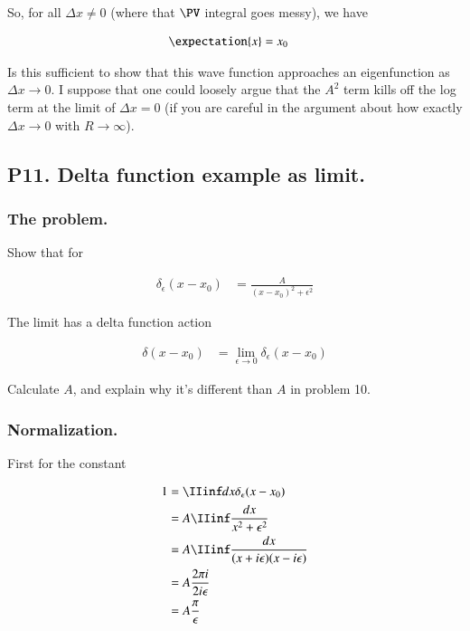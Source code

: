 So, for all $\Delta x \ne 0$ (where that $\PV$ integral goes messy), we have

\begin{align*}
\expectation{x} &= x_0 
\end{align*}

Is this sufficient to show that this wave function approaches an eigenfunction as $\Delta x \rightarrow 0$.
I suppose that one could loosely argue that the $A^2$ term kills off the log term at the limit of $\Delta x = 0$ (if you are careful in the argument about how exactly $\Delta x \rightarrow 0$ with $R \rightarrow \infty$).

\subsection{P11. Delta function example as limit. }

\subsubsection{The problem. }

Show that for

\begin{align*}
\delta_\epsilon(x - x_0) &= \frac{A}{(x-x_0)^2 + \epsilon^2}
\end{align*}

The limit has a delta function action

\begin{align*}
\delta(x - x_0) &= \lim_{\epsilon \rightarrow 0} \delta_\epsilon(x - x_0)
\end{align*}

Calculate $A$, and explain why it's different than $A$ in problem 10.

\subsubsection{Normalization. }

First for the constant

\begin{align*}
1 &= \IIinf dx \delta_\epsilon(x - x_0) \\
&= A \IIinf \frac{dx}{x^2 + \epsilon^2} \\
&= A \IIinf \frac{dx}{(x + i\epsilon)(x - i \epsilon)} \\
&= A \frac{2 \pi i}{ 2 i \epsilon } \\
&= A \frac{\pi}{\epsilon } \\
\end{align*}

